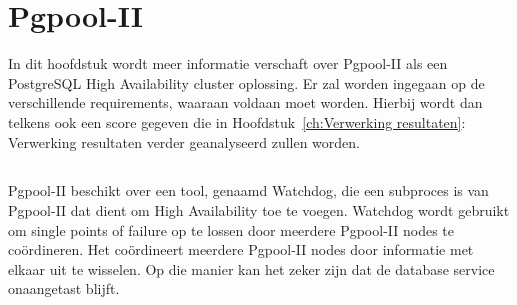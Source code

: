 
\chapter{Pgpool-II}
\label{ch:Pgpool-II}

In dit hoofdstuk wordt meer informatie verschaft over Pgpool-II als een PostgreSQL High Availability cluster oplossing. Er zal worden ingegaan op de verschillende requirements, waaraan voldaan moet worden. Hierbij wordt dan telkens ook een score gegeven die in Hoofdstuk~\ref{ch:Verwerking resultaten}: Verwerking resultaten verder geanalyseerd zullen worden.

\section{}
\label{sec:Inleiding tot Pgpool-II}

\section{}
\label{sec:Requirements}

\subsection{}
\label{subsec:Must have}


\subsubsection{}
\label{subsubsec:Replicatie}

Pgpool-II beschikt over een tool, genaamd Watchdog, die een subproces is van Pgpool-II dat dient om High Availability toe te voegen. Watchdog wordt gebruikt om single points of failure op te lossen door meerdere Pgpool-II nodes te coördineren. Het coördineert meerdere Pgpool-II nodes door informatie met elkaar uit te wisselen. Op die manier kan het zeker zijn dat de database service onaangetast blijft.

